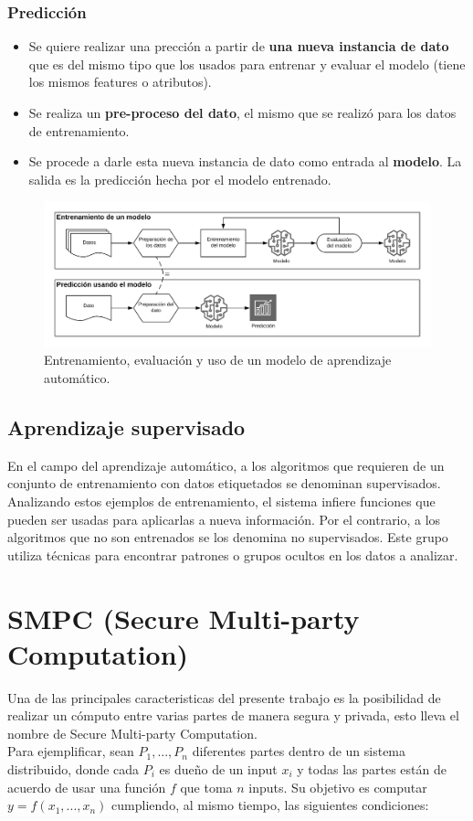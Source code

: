 \documentclass[
11pt, %
oneside, %
spanish, %
singlespacing, %
parskip, %
headsepline, %
chapterinoneline, %
]{MastersDoctoralThesis} %
\begin{document}
\subsubsection*{Predicción}
\begin{itemize}
\item Se quiere realizar una prección a partir de \textbf{una nueva instancia de dato} que es del mismo tipo que los usados para entrenar y evaluar el modelo (tiene los mismos features o atributos).
\item Se realiza un \textbf{pre-proceso del dato}, el mismo que se realizó para los datos de entrenamiento.
\item Se procede a darle esta nueva instancia de dato como entrada al \textbf{modelo}. La salida es la predicción hecha por el modelo entrenado.
\end{itemize}

\begin{figure}[H]
  	\centering
	\includegraphics[scale=0.15]{imgs/ml-processes.png}
	\caption{Entrenamiento, evaluación y uso de un modelo de aprendizaje automático.}
\end{figure}

\subsection{Aprendizaje supervisado}
En el campo del aprendizaje automático, a los algoritmos que requieren de un conjunto de entrenamiento con datos etiquetados se denominan supervisados. Analizando estos ejemplos de entrenamiento, el sistema infiere funciones que pueden ser usadas para aplicarlas a nueva información.
Por el contrario, a los algoritmos que no son entrenados se los denomina no supervisados. Este grupo utiliza técnicas para encontrar patrones o grupos ocultos en los datos a analizar.


\section{SMPC (Secure Multi-party Computation)}
\justify
Una de las principales caracteristicas del presente trabajo es la posibilidad de realizar un c\'omputo entre varias partes de manera segura y privada, esto lleva el nombre de Secure Multi-party Computation. \\ 
Para ejemplificar, sean $P_{1},...,P_{n}$ diferentes partes dentro de un sistema distribuido, donde cada $P_{i}$ es dueño de un input $x_{i}$ y todas las partes están de acuerdo de usar una función $f$ que toma $n$ inputs. Su objetivo es computar $y = f(x_{1},...,x_{n})$ cumpliendo, al mismo tiempo, las siguientes condiciones:
\end{document}
